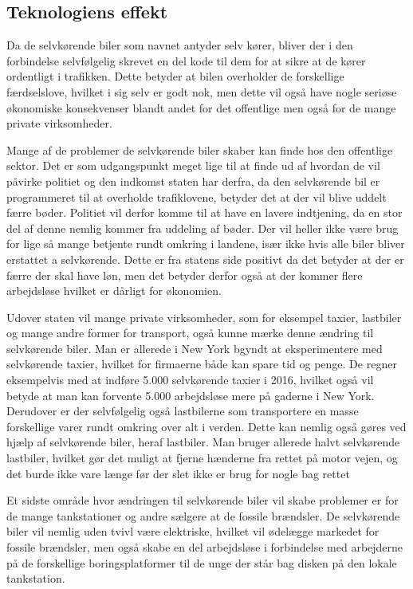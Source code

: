 \subsection{Teknologiens effekt}
Da de selvkørende biler som navnet antyder selv kører, bliver der i den forbindelse selvfølgelig skrevet en del kode til dem for at sikre at de kører ordentligt i trafikken. Dette betyder at bilen overholder de forskellige færdselslove, hvilket i sig selv er godt nok, men dette vil også have nogle seriøse økonomiske konsekvenser blandt andet for det offentlige men også for de mange private virksomheder. 

Mange af de problemer de selvkørende biler skaber kan finde hos den offentlige sektor. Det er som udgangspunkt meget lige til at finde ud af hvordan de vil påvirke politiet og den indkomst staten har derfra, da den selvkørende bil er programmeret til at overholde trafiklovene, betyder det at der vil blive uddelt færre bøder. Politiet vil derfor komme til at have en lavere indtjening, da en stor del af denne nemlig kommer fra uddeling af bøder\cite{B}. Der vil heller ikke være brug for lige så mange betjente rundt omkring i landene, især ikke hvis alle biler bliver erstattet a selvkørende. Dette er fra statens side positivt da det betyder at der er færre der skal have løn, men det betyder derfor også at der kommer flere arbejdsløse hvilket er dårligt for økonomien.

Udover staten vil mange private virksomheder, som for eksempel taxier, lastbiler og mange andre former for transport, også kunne mærke denne ændring til selvkørende biler. Man er allerede i New York bgyndt at eksperimentere med selvkørende taxier, hvilket for firmaerne både kan spare tid og penge. De regner eksempelvis med at indføre 5.000 selvkørende taxier i 2016, hvilket også vil betyde at man kan forvente 5.000 arbejdsløse mere på gaderne i New York. Derudover er der selvfølgelig også lastbilerne som transportere en masse forskellige varer rundt omkring over alt i verden. Dette kan nemlig også gøres ved hjælp af selvkørende biler, heraf lastbiler. Man bruger allerede halvt selvkørende lastbiler, hvilket gør det muligt at fjerne hænderne fra rettet på motor vejen, og det burde ikke vare længe før der slet ikke er brug for nogle bag rettet

Et sidste område hvor ændringen til selvkørende biler vil skabe problemer er for de mange tankstationer og andre sælgere at de fossile brændsler. De selvkørende biler vil nemlig uden tvivl være elektriske, hvilket vil ødelægge markedet for fossile brændsler, men også skabe en del arbejdsløse i forbindelse med arbejderne på de forskellige boringsplatformer til de unge der står bag disken på den lokale tankstation.

